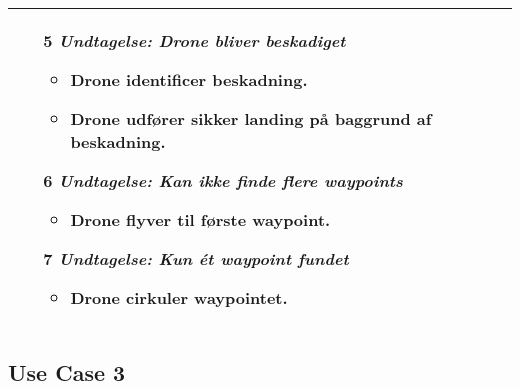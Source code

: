 \documentclass[Main]{subfiles}
\begin{document}
\begin{longtable}{|p{}|p{}|}
	
	\begin{enumerate}[noitemsep,nolistsep,leftmargin=*]
	\item[5] \textit{Undtagelse: Drone bliver beskadiget}
		\begin{itemize}[noitemsep,nolistsep]
		\item Drone identificer beskadning.
		\item Drone udfører sikker landing på baggrund af beskadning.
		\end{itemize}
	\end{enumerate}	
	
	
	\begin{enumerate}[noitemsep,nolistsep,leftmargin=*]
	\item[6] \textit{Undtagelse: 	Kan ikke finde flere waypoints}
		\begin{itemize}[noitemsep,nolistsep]
		\item Drone flyver til første waypoint.
		\end{itemize}
	\end{enumerate}	
	
	\begin{enumerate}[noitemsep,nolistsep,leftmargin=*]
	\item[7] \textit{Undtagelse: 	Kun ét waypoint fundet}
		\begin{itemize}[noitemsep,nolistsep]
		\item Drone cirkuler waypointet.
		\end{itemize}
	\end{enumerate}	 \\

\hline
\end{longtable}


	

	
\subsection{Use Case 3}
\end{document}
